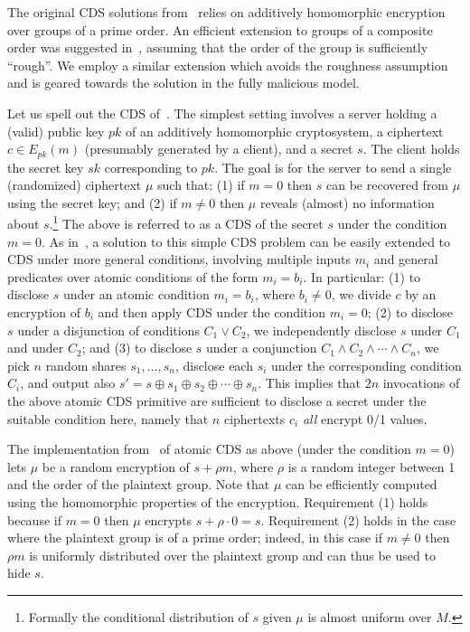 \documentclass[11pt]{article}
\begin{document}
The original CDS solutions from~\cite{AIR01}  relies on additively homomorphic
encryption over groups of a prime order. An efficient extension to
groups of a composite order was suggested in~\cite{L05}, assuming
that the order of the group is sufficiently ``rough''. We employ a
similar extension which avoids the roughness assumption and is
geared towards the solution in the fully malicious model.
 

Let us spell out the CDS of~\cite{AIR01}. The simplest
setting involves a server holding a (valid) public key $pk$ of an additively
homomorphic cryptosystem, a ciphertext $c\in E_{pk}(m)$ (presumably
generated by a client), and a secret $s$. The client holds the
secret key $sk$ corresponding to $pk$. The goal is for the server
to send a single (randomized) ciphertext $\mu$ such that: (1) if
$m=0$ then $s$ can be recovered from $\mu$ using the secret key;
and (2) if $m\neq 0$ then $\mu$ reveals (almost) no information
about $s$.\footnote{Formally the conditional distribution of $s$ given $\mu$ is almost uniform over $M$.} The above is referred to as a CDS of the secret $s$
under the condition $m=0$. As in~\cite{GIKM,AIR01}, a solution to
this simple CDS problem can be easily extended to CDS under more
general conditions, involving multiple inputs $m_i$ and general
predicates over atomic conditions of the form $m_i=b_i$. In
particular: (1) to disclose $s$ under an atomic condition
$m_i=b_i$, where $b_i\neq 0$, we divide $c$ by an encryption of
$b_i$ and then apply CDS under the condition $m_i=0$; (2) to
disclose $s$ under a disjunction of conditions $C_1\vee C_2$, we
independently disclose $s$ under $C_1$ and under $C_2$; and (3) to
disclose $s$ under a conjunction $C_1\wedge C_2\wedge \cdots \wedge
C_n$, we pick $n$ random shares $s_1,\ldots,s_n$, disclose each $s_i$ under the corresponding condition $C_i$,
and output also $s'=s\oplus s_1\oplus s_2\oplus\cdots\oplus s_n$. This implies that
$2n$ invocations of the above atomic CDS primitive are sufficient
to disclose a secret under the suitable condition here, namely that
$n$ ciphertexts $c_i$ {\em all} encrypt 0/1 values.

The implementation from~\cite{AIR01} of atomic CDS as above (under
the condition $m=0$) lets $\mu$ be a random encryption of $s+\rho
m$, where $\rho$ is a random integer between 1 and the order of the
plaintext group. Note that $\mu$ can be efficiently computed using
the homomorphic properties of the encryption. Requirement (1) holds
because if $m=0$ then $\mu$ encrypts $s+\rho\cdot 0=s$. Requirement
(2) holds in the case where the plaintext group is of a prime
order; indeed, in this case if $m\neq 0$ then $\rho m$ is uniformly
distributed over the plaintext group and can thus be used to hide
$s$.
\end{document}
